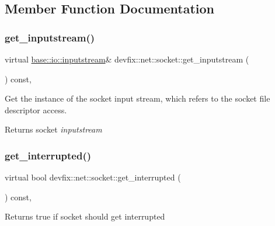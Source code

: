 \subsection{Member Function Documentation}
\mbox{\label{structdevfix_1_1net_1_1socket_a3a00115497ccb83e8497a7e33be06b03}} 
\subsubsection{\texorpdfstring{get\+\_\+inputstream()}{get\_inputstream()}}
{\footnotesize\ttfamily virtual \hyperlink{structdevfix_1_1base_1_1io_1_1inputstream}{base\+::io\+::inputstream}\& devfix\+::net\+::socket\+::get\+\_\+inputstream (\begin{DoxyParamCaption}{ }\end{DoxyParamCaption}) const\hspace{0.3cm}{\ttfamily [pure virtual]}, {\ttfamily [noexcept]}}



Get the instance of the socket input stream, which refers to the socket file descriptor access. 

\begin{DoxyReturn}{Returns}
socket {\itshape inputstream} 
\end{DoxyReturn}
\mbox{\label{structdevfix_1_1net_1_1socket_a61d5db2ef1bff2b54fc8d5d9d27a2bbc}} 
\subsubsection{\texorpdfstring{get\+\_\+interrupted()}{get\_interrupted()}}
{\footnotesize\ttfamily virtual bool devfix\+::net\+::socket\+::get\+\_\+interrupted (\begin{DoxyParamCaption}{ }\end{DoxyParamCaption}) const\hspace{0.3cm}{\ttfamily [pure virtual]}, {\ttfamily [noexcept]}}

\begin{DoxyReturn}{Returns}
true if socket should get interrupted 
\end{DoxyReturn}
\mbox{\label{structdevfix_1_1net_1_1socket_a570b728ca81a3d47ca7733ff21063318}} 
